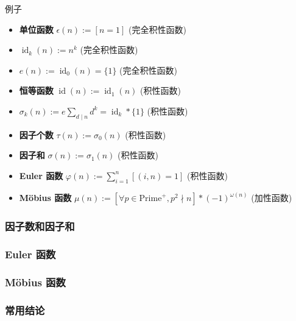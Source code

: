 \begin{frame}{例子}
	\label{mulf:ssec:example}

	\begin{itemize}
		\item<1-> \textbf{单位函数} \(\epsilon(n):=[n=1]\) (完全积性函数)
		\item<2-> \(\operatorname{id}_k(n):=n^k\) (完全积性函数)
		\item<3-> \(e(n):=\operatorname{id}_0(n)=\{1\}\) (完全积性函数)
		\item<4-> \textbf{恒等函数} \(\operatorname{id}(n):=\operatorname{id}_1(n)\) (积性函数)
		\item<5-> \(\sigma_k(n):=e\sum_{d\mid n}d^k=\operatorname{id}_k*\{1\}\) (积性函数)
		\item<6-> \textbf{因子个数} \(\tau(n):=\sigma_0(n)\) (积性函数)
		\item<7-> \textbf{因子和} \(\sigma(n):=\sigma_1(n)\) (积性函数)
		\item<8-> \textbf{Euler 函数} \(\varphi(n):=\sum_{i=1}^n[(i,n)=1]\) (积性函数)
		\item<9-> \textbf{M\"obius 函数} \(\mu(n):=[\forall p\in\text{Prime}^+,p^2\nmid n]*(-1)^{\omega(n)}\) (加性函数)
	\end{itemize}
\end{frame}


\subsubsection{因子数和因子和}
\label{mulf:ssec:tausigmaf}




\subsubsection{Euler 函数}
\label{mulf:ssec:eulerf}




\subsubsection{M\"obius 函数}
\label{mulf:ssec:mobiusf}




\subsubsection{常用结论}
\label{mulf:ssec:fc}


